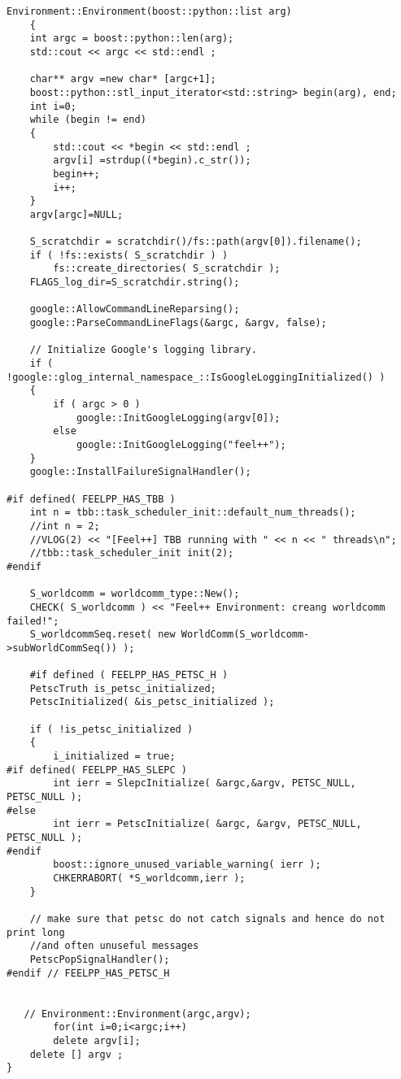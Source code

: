 \documentclass[12pt]{article}
\begin{document}
\begin{lstlisting}
Environment::Environment(boost::python::list arg)
    {
    int argc = boost::python::len(arg);
    std::cout << argc << std::endl ;
        
    char** argv =new char* [argc+1];
    boost::python::stl_input_iterator<std::string> begin(arg), end;
    int i=0;
    while (begin != end)
    {
        std::cout << *begin << std::endl ;
        argv[i] =strdup((*begin).c_str());
        begin++;
        i++;
    }
    argv[argc]=NULL;
    
    S_scratchdir = scratchdir()/fs::path(argv[0]).filename();
    if ( !fs::exists( S_scratchdir ) )
        fs::create_directories( S_scratchdir );
    FLAGS_log_dir=S_scratchdir.string();

    google::AllowCommandLineReparsing();
    google::ParseCommandLineFlags(&argc, &argv, false);

    // Initialize Google's logging library.
    if ( !google::glog_internal_namespace_::IsGoogleLoggingInitialized() )
    {
        if ( argc > 0 )
            google::InitGoogleLogging(argv[0]);
        else
            google::InitGoogleLogging("feel++");
    }
    google::InstallFailureSignalHandler();

#if defined( FEELPP_HAS_TBB )
    int n = tbb::task_scheduler_init::default_num_threads();
    //int n = 2;
    //VLOG(2) << "[Feel++] TBB running with " << n << " threads\n";
    //tbb::task_scheduler_init init(2);
#endif

    S_worldcomm = worldcomm_type::New();
    CHECK( S_worldcomm ) << "Feel++ Environment: creang worldcomm failed!";
    S_worldcommSeq.reset( new WorldComm(S_worldcomm->subWorldCommSeq()) );

    #if defined ( FEELPP_HAS_PETSC_H )
    PetscTruth is_petsc_initialized;
    PetscInitialized( &is_petsc_initialized );

    if ( !is_petsc_initialized )
    {
        i_initialized = true;
#if defined( FEELPP_HAS_SLEPC )
        int ierr = SlepcInitialize( &argc,&argv, PETSC_NULL, PETSC_NULL );
#else
        int ierr = PetscInitialize( &argc, &argv, PETSC_NULL, PETSC_NULL );
#endif
        boost::ignore_unused_variable_warning( ierr );
        CHKERRABORT( *S_worldcomm,ierr );
    }

    // make sure that petsc do not catch signals and hence do not print long
    //and often unuseful messages
    PetscPopSignalHandler();
#endif // FEELPP_HAS_PETSC_H
     

   // Environment::Environment(argc,argv);
        for(int i=0;i<argc;i++)
        delete argv[i];
    delete [] argv ;    
}
\end{lstlisting}
\end{document}
